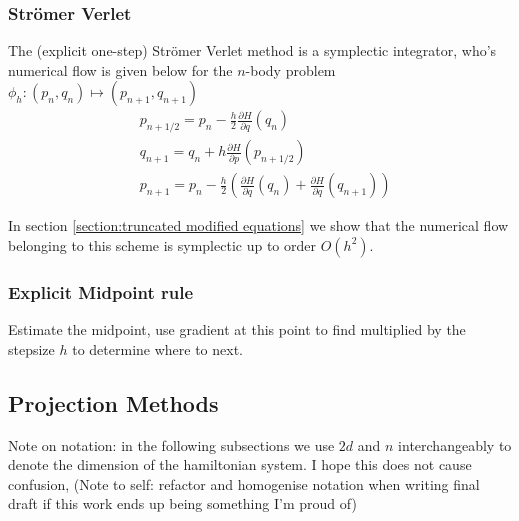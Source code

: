 \documentclass[12pt]{article}
\begin{document}
\subsubsection{Str\"omer Verlet}
The (explicit one-step) Str\"omer Verlet method is a symplectic integrator, who's numerical flow is given below for the $n$-body problem $\phi_h : (p_n,q_n)\mapsto (p_{n+1},q_{n+1})$
\begin{equation}\label{eq:stromer verlet n body}
\begin{split}
    & p_{n+1/2} = p_n - \frac{h}{2}\frac{\partial H}{\partial q}(q_n)\\
    & q_{n+1} = q_n + h \frac{\partial H}{\partial p}(p_{n+1/2})\\
    & p_{n+1} = p_n - \frac{h}{2}\left( \frac{\partial H}{\partial q}(q_n) + \frac{\partial H}{\partial q}(q_{n+1}) \right)
\end{split}
\end{equation}

In section \ref{section:truncated modified equations} we show that the numerical flow belonging to this scheme is symplectic up to order $O(h^2)$. 

\subsubsection{Explicit Midpoint rule}
Estimate the midpoint, use gradient at this point to find multiplied by the stepsize $h$ to determine where to next.

\subsection{Projection Methods}

Note on notation: in the following subsections we use $2d$ and $n$ interchangeably to denote the dimension of the hamiltonian system. I hope this does not cause confusion, (Note to self: refactor and homogenise notation when writing final draft if this work ends up being something I'm proud of) 
\end{document}

